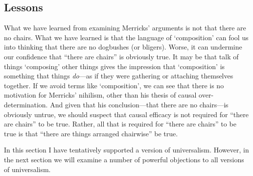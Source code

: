 \documentclass[11pt]{article}
\begin{document}
\begin{spacing}{1.25}
\section{Lessons}
What we have learned from examining Merricks' arguments is not that
there are no chairs.  What we have learned is that the language of
`composition' can fool us into thinking that there are no dogbushes
(or bligers).  Worse, it can undermine our confidence that ``there are
chairs'' is obviously true.  It may be that talk of things `composing'
other things gives the impression that `composition' is something that
things {\em do}---as if they were gathering or attaching themselves
together.  If we avoid terms like `composition', we can see that there
is no motivation for Merricks' nihilism, other than his thesis of
causal over-determination.  And given that his conclusion---that there
are no chairs---is obviously untrue, we should suspect that causal
efficacy is not required for ``there are chairs'' to be true.  Rather,
all that is required for ``there are chairs'' to be true is that
``there are things arranged chairwise'' be true.

In this section I have tentatively supported a version of
universalism.  However, in the next section we will examine a number
of powerful objections to all versions of universalism.

\ifstandalone
\end{spacing}


\fi
\end{document}
